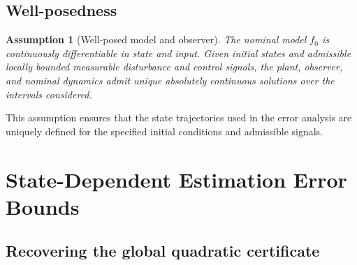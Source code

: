 \documentclass[11pt,a4paper]{article}
\numberwithin{equation}{section}
\newtheorem{assumption}{Assumption}
\theoremstyle{remark}\newtheorem{remark}{Remark}
\begin{document}
\subsection{Well-posedness}
\begin{assumption}[Well-posed model and observer]\label{ass:wellposed}
The nominal model $f_0$ is continuously differentiable in state and input. Given initial states and admissible locally bounded measurable disturbance and control signals, the plant, observer, and nominal dynamics admit unique absolutely continuous solutions over the intervals considered.
\end{assumption}
This assumption ensures that the state trajectories used in the error analysis are uniquely defined for the specified initial conditions and admissible signals.
\section{State-Dependent Estimation Error Bounds}
\subsection{Recovering the global quadratic certificate}
\end{document}
